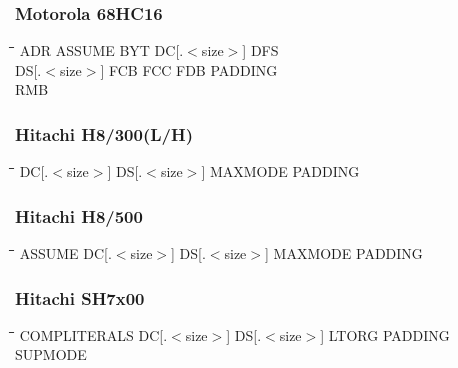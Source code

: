 \subsubsection{Motorola 68HC16}
{\tt\begin{tabbing}
\hspace{3cm}\=\hspace{3cm}\=\hspace{3cm}\=\hspace{3cm}\=\kill
ADR        \> ASSUME      \> BYT         \> DC[.$<$size$>$] \> DFS \\
DS[.$<$size$>$] FCB       \> FCC         \> FDB         \> PADDING \\
RMB \\
\end{tabbing}}

\subsubsection{Hitachi H8/300(L/H)}
{\tt\begin{tabbing}
\hspace{3cm}\=\hspace{3cm}\=\hspace{3cm}\=\hspace{3cm}\=\kill
DC[.$<$size$>$] \> DS[.$<$size$>$] \> MAXMODE     \> PADDING \\
\end{tabbing}}

\subsubsection{Hitachi H8/500}
{\tt\begin{tabbing}
\hspace{3cm}\=\hspace{3cm}\=\hspace{3cm}\=\hspace{3cm}\=\kill
ASSUME     \> DC[.$<$size$>$] \> DS[.$<$size$>$] \> MAXMODE     \> PADDING \\
\end{tabbing}}

\subsubsection{Hitachi SH7x00}
{\tt\begin{tabbing}
\hspace{3cm}\=\hspace{3cm}\=\hspace{3cm}\=\hspace{3cm}\=\kill
COMPLITERALS \> DC[.$<$size$>$]  \>  DS[.$<$size$>$]  \>  LTORG    \> PADDING \\
SUPMODE \\
\end{tabbing}}

